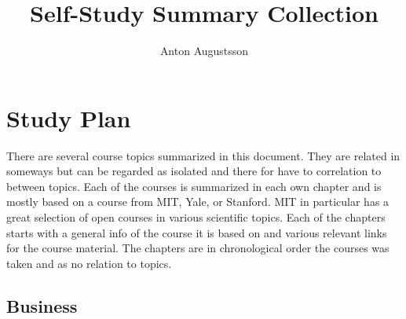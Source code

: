 \documentclass{book}
\title{Self-Study Summary Collection}
\author{Anton Augustsson}
\begin{document}
\maketitle
\newpage
\tableofcontents
\newpage



\chapter{Study Plan}
There are several course topics summarized in this document.
They are related in someways but can be regarded as isolated and there for have to correlation to between topics.
Each of the courses is summarized in each own chapter and is mostly based on a course from MIT, Yale, or Stanford.
MIT in particular has a great selection of open courses in various scientific topics. Each of the chapters starts
with a general info of the course it is based on and various relevant links for the course material.
The chapters are in chronological order the courses was taken and as no relation to topics.
\newpage

\section{Business}
\resizebox{0.9\textwidth}{!}{} \newpage



\newcommand{\pathBU}{chapters}

\newcommand{\pathAUD}{\pathBU/Auditing-and-Assurance}  \newpage
\newcommand{\pathISC}{\pathBU/Information-and-System-Control}  \newpage
\newcommand{\pathFAR}{\pathBU/Financial-Accounting-and-Reporting}  \newpage
\newcommand{\pathBAR}{\pathBU/Business-Analysis-and-Reporting}  \newpage
\newcommand{\pathREG}{\pathBU/Taxation-and-Regulation}  \newpage
\newcommand{\pathTCP}{\pathBU/Tax-Complience-and-Planning}  \newpage

\newcommand{\pathCFSFM}{\pathBU/Corporate-Finance-and-Strategic-Financial-Management}  \newpage
\newcommand{\pathSMBP}{\pathBU/Strategic-Management-and-Business-Policy}  \newpage
\newcommand{\pathOSCM}{\pathBU/Operations-and-Supply-Chain-Management}  \newpage
\newcommand{\pathGBIM}{\pathBU/Global-Business-and-International-Management}  \newpage
\end{document}
